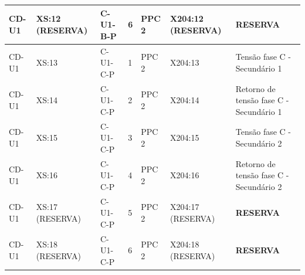 \documentclass[11pt,a4paper]{article}
\newcommand{\res}{\textbf{RESERVA}}
\begin{document}
\begin{landscape}
\begin{longtable}{@{}L{2.5cm}L{2.4cm}L{2.8cm}L{0.85cm}L{2.4cm}L{2.6cm}L{9.5cm}@{}}
CD-U1 & XS:12 (RESERVA) & C-U1-B-P & 6 & PPC 2 & X204:12 (RESERVA) & \res{}\\
\midrule
CD-U1 & XS:13 & C-U1-C-P & 1 & PPC 2 & X204:13 & Tensão fase C - Secundário 1\\
CD-U1 & XS:14 & C-U1-C-P & 2 & PPC 2 & X204:14 & Retorno de tensão fase C - Secundário 1\\
CD-U1 & XS:15 & C-U1-C-P & 3 & PPC 2 & X204:15 & Tensão fase C - Secundário 2\\
CD-U1 & XS:16 & C-U1-C-P & 4 & PPC 2 & X204:16 & Retorno de tensão fase C - Secundário 2\\
CD-U1 & XS:17 (RESERVA) & C-U1-C-P & 5 & PPC 2 & X204:17 (RESERVA) & \res{}\\
CD-U1 & XS:18 (RESERVA) & C-U1-C-P & 6 & PPC 2 & X204:18 (RESERVA) & \res{}\\
\end{longtable}\endgroup\end{landscape}
\end{document}
